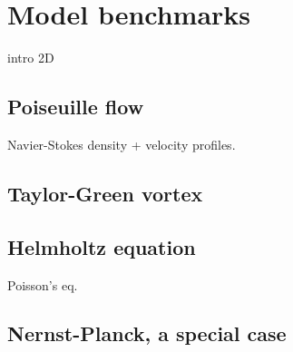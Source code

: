 \chapter{Model benchmarks}
intro 2D

\section{Poiseuille flow}
Navier-Stokes
density + velocity profiles.

\section{Taylor-Green vortex}

\section{Helmholtz equation}
Poisson's eq. 



\section{Nernst-Planck, a special case}
